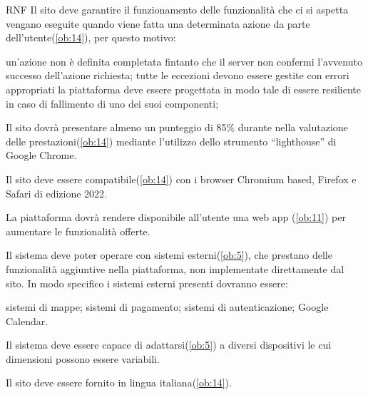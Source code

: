 \begin{listaPersonale}{RNF}
     Il sito deve garantire il funzionamento delle funzionalità che ci si aspetta vengano eseguite quando viene fatta una determinata azione da parte dell'utente(\ref{ob:14}), per questo motivo:
    \begin{listaPersonale2}{}
         un'azione non è definita completata fintanto che il server non confermi l'avvenuto successo dell'azione richiesta;
         tutte le eccezioni devono essere gestite con errori appropriati
         la piattaforma deve essere progettata in modo tale di essere resiliente in caso di fallimento di uno dei suoi componenti;
    \end{listaPersonale2}

     Il sito dovrà presentare almeno un punteggio di 85\% durante nella valutazione delle prestazioni(\ref{ob:14}) mediante l'utilizzo dello strumento “lighthouse” di Google Chrome.

     Il sito deve essere compatibile(\ref{ob:14}) con i browser Chromium based, Firefox e Safari di edizione 2022.

     La piattaforma dovrà rendere disponibile all'utente una web app (\ref{ob:11}) per aumentare le funzionalità offerte.

     Il sistema deve poter operare con sistemi esterni(\ref{ob:5}), che prestano delle funzionalità aggiuntive nella piattaforma, non implementate direttamente dal sito. In modo specifico i sistemi esterni presenti dovranno essere:
    \begin{listaPersonale2}{}
         sistemi di mappe;
         sistemi di pagamento;
         sistemi di autenticazione;
         Google Calendar.
    \end{listaPersonale2}

     Il sistema deve essere capace di adattarsi(\ref{ob:5}) a diversi dispositivi le cui dimensioni possono essere variabili.

     Il sito deve essere fornito in lingua italiana(\ref{ob:14}).
\end{listaPersonale}